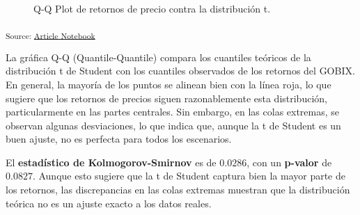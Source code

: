 \documentclass[
  number,
  preprint,
  3p,
  onecolumn]{elsarticle}
\begin{document}
\begin{figure}[H]


\caption{\label{fig-tqq-plot}Q-Q Plot de retornos de precio contra la
distribución t.}

\end{figure}%

\textsubscript{Source:
\href{https://iancont.github.io/fixed_income_garch/index-preview.html}{Article
Notebook}}

La gráfica Q-Q (Quantile-Quantile) compara los cuantiles teóricos de la
distribución t de Student con los cuantiles observados de los retornos
del GOBIX. En general, la mayoría de los puntos se alinean bien con la
línea roja, lo que sugiere que los retornos de precios siguen
razonablemente esta distribución, particularmente en las partes
centrales. Sin embargo, en las colas extremas, se observan algunas
desviaciones, lo que indica que, aunque la t de Student es un buen
ajuste, no es perfecta para todos los escenarios.

El \textbf{estadístico de Kolmogorov-Smirnov} es de \(0.0286\), con un
\textbf{p-valor} de \(0.0827\). Aunque esto sugiere que la t de Student
captura bien la mayor parte de los retornos, las discrepancias en las
colas extremas muestran que la distribución teórica no es un ajuste
exacto a los datos reales.
\end{document}
